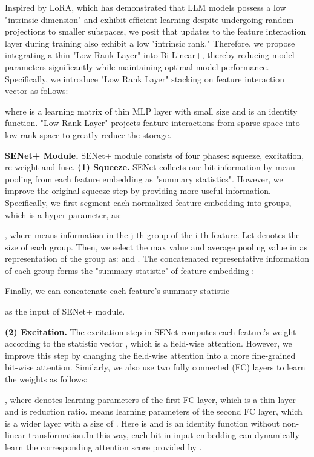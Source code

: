 \documentclass[sigconf]{acmart}
\begin{document}
Inspired by LoRA\cite{lora}, which has demonstrated that LLM models possess a low "intrinsic dimension" and exhibit efficient learning despite undergoing random projections to smaller subspaces, we posit that updates to the feature interaction layer during training also exhibit a low "intrinsic rank." Therefore, we propose integrating a thin "Low Rank Layer" into Bi-Linear+, thereby reducing model parameters significantly while maintaining optimal model performance. Specifically, we introduce "Low Rank Layer" stacking on feature interaction vector   as follows:
 
where  is a learning matrix of thin MLP layer with small size   and  is an identity function. "Low Rank Layer" projects feature interactions from  sparse space into low rank space to greatly reduce the storage.

\textbf{SENet+ Module.}
SENet+ module consists of four phases: squeeze, excitation, re-weight and fuse.
\textbf{(1) Squeeze.} SENet collects one bit information by mean pooling from each feature embedding as  "summary statistics". However, we improve the original squeeze step by providing more useful information. Specifically, we first segment each normalized feature embedding  into   groups, which is a hyper-parameter, as:
 
, where  means information in the j-th group of the i-th feature. Let  denotes the size of each group. Then, we select the max value  and average pooling value  in  as representation of the group as:
 and 
. The concatenated representative information of each group forms the "summary statistic"  of feature embedding  :

Finally, we can concatenate each feature's summary statistic 

as the input of SENet+ module.

\textbf{(2) Excitation.} The excitation step in SENet computes each feature's weight according to the statistic vector , which is a field-wise attention.  However, we improve this step by changing the field-wise attention into a more fine-grained bit-wise attention. Similarly, we also use two fully connected (FC) layers to learn the weights as follows:

, where   denotes 
learning parameters of the first FC layer, which is a thin layer and  is reduction ratio.  means learning parameters of the second FC layer, which is a wider layer with a size of . Here  is   and  is an identity function without non-linear transformation.In this way, each bit in input embedding can dynamically learn the corresponding attention score provided by . 
\end{document}
